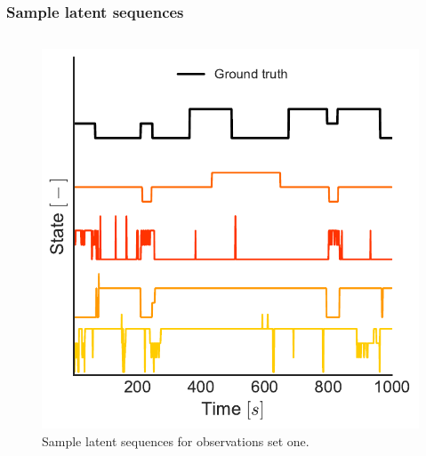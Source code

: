 \documentclass[aspectratio=169]{beamer}
\begin{document}
\begin{frame}
    \frametitle{Sample latent sequences}

    \begin{columns}[c] 


        \begin{figure}
            \includegraphics[width=1.0\linewidth]{state-seq-data1.pdf}
            \caption{Sample latent sequences for observations set one.}
        \end{figure}



\end{columns}
\end{frame}
\end{document}
